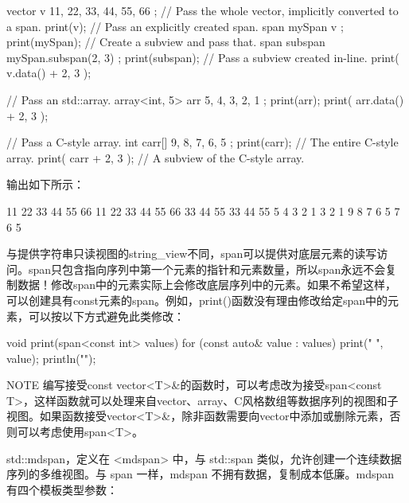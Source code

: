 \begin{cpp}
vector v { 11, 22, 33, 44, 55, 66 };
// Pass the whole vector, implicitly converted to a span.
print(v);
// Pass an explicitly created span.
span mySpan { v };
print(mySpan);
// Create a subview and pass that.
span subspan { mySpan.subspan(2, 3) };
print(subspan);
// Pass a subview created in-line.
print({ v.data() + 2, 3 });

// Pass an std::array.
array<int, 5> arr { 5, 4, 3, 2, 1 };
print(arr);
print({ arr.data() + 2, 3 });

// Pass a C-style array.
int carr[] { 9, 8, 7, 6, 5 };
print(carr); // The entire C-style array.
print({ carr + 2, 3 }); // A subview of the C-style array.
\end{cpp}

输出如下所示：

\begin{shell}
11 22 33 44 55 66
11 22 33 44 55 66
33 44 55
33 44 55
5 4 3 2 1
3 2 1
9 8 7 6 5
7 6 5
\end{shell}

与提供字符串只读视图的string\_view不同，span可以提供对底层元素的读写访问。span只包含指向序列中第一个元素的指针和元素数量，所以span永远不会复制数据！修改span中的元素实际上会修改底层序列中的元素。如果不希望这样，可以创建具有const元素的span。例如，print()函数没有理由修改给定span中的元素，可以按以下方式避免此类修改：

\begin{cpp}
void print(span<const int> values)
{
    for (const auto& value : values) { print("{} ", value); }
    println("");
}
\end{cpp}

\begin{myNotic}{NOTE}
编写接受const vector<T>\&的函数时，可以考虑改为接受span<const T>，这样函数就可以处理来自vector、array、C风格数组等数据序列的视图和子视图。如果函数接受vector<T>\&，除非函数需要向vector中添加或删除元素，否则可以考虑使用span<T>。
\end{myNotic}



std::mdspan，定义在 <mdspan> 中，与 std::span 类似，允许创建一个连续数据序列的多维视图。与 span 一样，mdspan 不拥有数据，复制成本低廉。mdspan 有四个模板类型参数：

